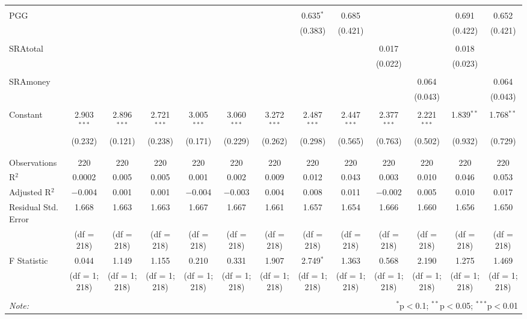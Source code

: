 \documentclass[12pt]{article}
\begin{document}
\begin{table}[!htbp]
{\begin{adjustbox}{width=\textwidth}
\begin{tabular}{@{\extracolsep{5pt}}lcccccccccccc}
  & & & & & & & & & & & & \\ 
 PGG &  &  &  &  &  &  & 0.635$^{*}$ & 0.685 &  &  & 0.691 & 0.652 \\ 
  &  &  &  &  &  &  & (0.383) & (0.421) &  &  & (0.422) & (0.421) \\ 
  & & & & & & & & & & & & \\ 
 SRAtotal &  &  &  &  &  &  &  &  & 0.017 &  & 0.018 &  \\ 
  &  &  &  &  &  &  &  &  & (0.022) &  & (0.023) &  \\ 
  & & & & & & & & & & & & \\ 
 SRAmoney &  &  &  &  &  &  &  &  &  & 0.064 &  & 0.064 \\ 
  &  &  &  &  &  &  &  &  &  & (0.043) &  & (0.043) \\ 
  & & & & & & & & & & & & \\ 
 Constant & 2.903$^{***}$ & 2.896$^{***}$ & 2.721$^{***}$ & 3.005$^{***}$ & 3.060$^{***}$ & 3.272$^{***}$ & 2.487$^{***}$ & 2.447$^{***}$ & 2.377$^{***}$ & 2.221$^{***}$ & 1.839$^{**}$ & 1.768$^{**}$ \\ 
  & (0.232) & (0.121) & (0.238) & (0.171) & (0.229) & (0.262) & (0.298) & (0.565) & (0.763) & (0.502) & (0.932) & (0.729) \\ 
  & & & & & & & & & & & & \\ 
\hline \\[-1.8ex] 
Observations & 220 & 220 & 220 & 220 & 220 & 220 & 220 & 220 & 220 & 220 & 220 & 220 \\ 
R$^{2}$ & 0.0002 & 0.005 & 0.005 & 0.001 & 0.002 & 0.009 & 0.012 & 0.043 & 0.003 & 0.010 & 0.046 & 0.053 \\ 
Adjusted R$^{2}$ & $-$0.004 & 0.001 & 0.001 & $-$0.004 & $-$0.003 & 0.004 & 0.008 & 0.011 & $-$0.002 & 0.005 & 0.010 & 0.017 \\ 
Residual Std. Error & 1.668 & 1.663 & 1.663 & 1.667 & 1.667 & 1.661 & 1.657 & 1.654 & 1.666  & 1.660 & 1.656  & 1.650 \\ 
& (df = 218) & (df = 218) & (df = 218) & (df = 218) & (df = 218) & (df = 218) & (df = 218) & (df = 218) & (df = 218) & (df = 218) & (df = 218) & (df = 218) \\
F Statistic & 0.044 & 1.149  & 1.155 & 0.210  & 0.331 & 1.907 & 2.749$^{*}$ & 1.363 & 0.568 & 2.190 & 1.275  & 1.469 \\ 
& (df = 1; 218) & (df = 1; 218) & (df = 1; 218) & (df = 1; 218) & (df = 1; 218) & (df = 1; 218) & (df = 1; 218) & (df = 1; 218) & (df = 1; 218) & (df = 1; 218) & (df = 1; 218) & (df = 1; 218) \\
\hline 
\hline \\[-1.8ex] 
\textit{Note:}  & \multicolumn{12}{r}{$^{*}$p$<$0.1; $^{**}$p$<$0.05; $^{***}$p$<$0.01} \\ 
\end{tabular} 
\end{adjustbox}
}
\end{table} 
\end{document}
